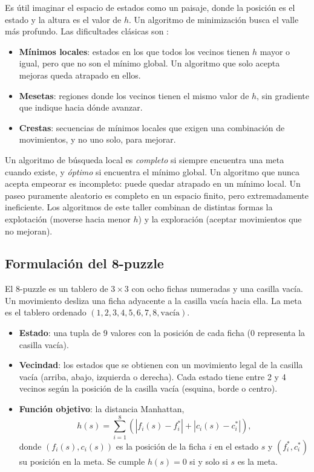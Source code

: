 \documentclass[12pt,a4paper]{article}
\begin{document}
Es útil imaginar el espacio de estados como un paisaje, donde la
posición es el estado y la altura es el valor de $h$. Un algoritmo de
minimización busca el valle más profundo. Las dificultades clásicas
son \cite{russell2021}:

\begin{itemize}
    \item \textbf{Mínimos locales}: estados en los que todos los vecinos
    tienen $h$ mayor o igual, pero que no son el mínimo global. Un
    algoritmo que solo acepta mejoras queda atrapado en ellos.
    \item \textbf{Mesetas}: regiones donde los vecinos tienen el mismo
    valor de $h$, sin gradiente que indique hacia dónde avanzar.
    \item \textbf{Crestas}: secuencias de mínimos locales que exigen
    una combinación de movimientos, y no uno solo, para mejorar.
\end{itemize}

Un algoritmo de búsqueda local es \emph{completo} si siempre encuentra
una meta cuando existe, y \emph{óptimo} si encuentra el mínimo global.
Un algoritmo que nunca acepta empeorar es incompleto: puede quedar
atrapado en un mínimo local. Un paseo puramente aleatorio es completo
en un espacio finito, pero extremadamente ineficiente. Los algoritmos
de este taller combinan de distintas formas la explotación (moverse
hacia menor $h$) y la exploración (aceptar movimientos que no mejoran).

\subsection{Formulación del 8-puzzle}

El 8-puzzle es un tablero de $3 \times 3$ con ocho fichas numeradas y
una casilla vacía. Un movimiento desliza una ficha adyacente a la
casilla vacía hacia ella. La meta es el tablero ordenado
$(1, 2, 3, 4, 5, 6, 7, 8, \text{vacía})$.

\begin{itemize}
    \item \textbf{Estado}: una tupla de 9 valores con la posición de
    cada ficha (0 representa la casilla vacía).
    \item \textbf{Vecindad}: los estados que se obtienen con un
    movimiento legal de la casilla vacía (arriba, abajo, izquierda o
    derecha). Cada estado tiene entre 2 y 4 vecinos según la posición
    de la casilla vacía (esquina, borde o centro).
    \item \textbf{Función objetivo}: la distancia Manhattan,
    \begin{equation}
        h(s) = \sum_{i=1}^{8} \left( |f_i(s) - f_i^*| + |c_i(s) - c_i^*| \right),
    \end{equation}
    donde $(f_i(s), c_i(s))$ es la posición de la ficha $i$ en el
    estado $s$ y $(f_i^*, c_i^*)$ su posición en la meta. Se cumple
    $h(s) = 0$ si y solo si $s$ es la meta.
\end{itemize}
\end{document}
